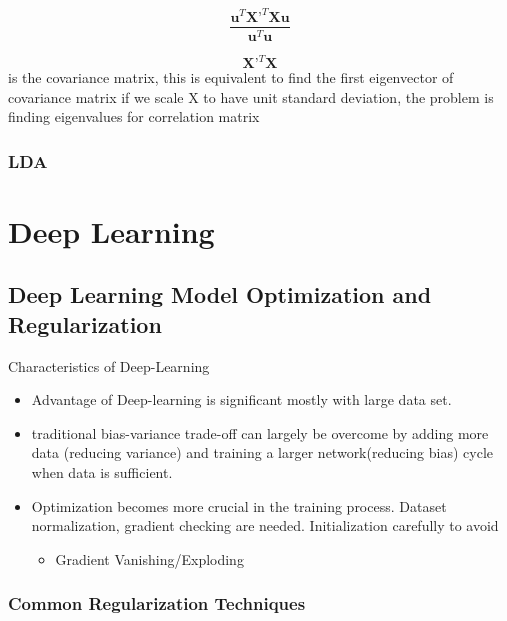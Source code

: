 \documentclass[11pt, openany]{book}              %
\begin{document}
$$\frac{ \mathbf{u}^T\mathbf{X}’^T\mathbf{X} \mathbf{u}}{ \mathbf{u}^T \mathbf{u}}$$  

$$\mathbf{X}’^T\mathbf{X}$$ is the covariance matrix, this is equivalent to find the first eigenvector of covariance matrix
if we scale X to have unit standard deviation, the problem is finding eigenvalues for correlation matrix 


\section{LDA}


\part{Deep Learning}

\chapter{Deep Learning Model Optimization and Regularization}

Characteristics of Deep-Learning

\begin{itemize}
    \item Advantage of Deep-learning is significant mostly with large data set.
    \item traditional bias-variance trade-off can largely be overcome by adding more data (reducing variance) and training a larger network(reducing bias) cycle when data is sufficient.
    \item Optimization becomes more crucial in the training process. Dataset normalization, gradient checking are needed. Initialization carefully to avoid 
    \begin{itemize}
    	\item Gradient Vanishing/Exploding	
    \end{itemize}
\end{itemize}

\section{Common Regularization Techniques}
\end{document}
